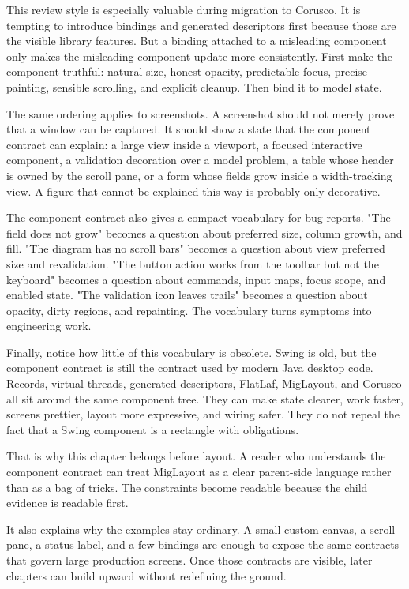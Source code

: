 This review style is especially valuable during migration to Corusco. It is
tempting to introduce bindings and generated descriptors first because those are
the visible library features. But a binding attached to a misleading component
only makes the misleading component update more consistently. First make the
component truthful: natural size, honest opacity, predictable focus, precise
painting, sensible scrolling, and explicit cleanup. Then bind it to model state.

The same ordering applies to screenshots. A screenshot should not merely prove
that a window can be captured. It should show a state that the component
contract can explain: a large view inside a viewport, a focused interactive
component, a validation decoration over a model problem, a table whose header is
owned by the scroll pane, or a form whose fields grow inside a width-tracking
view. A figure that cannot be explained this way is probably only decorative.

The component contract also gives a compact vocabulary for bug reports. "The
field does not grow" becomes a question about preferred size, column growth, and
fill. "The diagram has no scroll bars" becomes a question about view preferred
size and revalidation. "The button action works from the toolbar but not the
keyboard" becomes a question about commands, input maps, focus scope, and
enabled state. "The validation icon leaves trails" becomes a question about
opacity, dirty regions, and repainting. The vocabulary turns symptoms into
engineering work.

Finally, notice how little of this vocabulary is obsolete. Swing is old, but the
component contract is still the contract used by modern Java desktop code.
Records, virtual threads, generated descriptors, FlatLaf, MigLayout, and
Corusco all sit around the same component tree. They can make state clearer,
work faster, screens prettier, layout more expressive, and wiring safer. They
do not repeal the fact that a Swing component is a rectangle with obligations.

That is why this chapter belongs before layout. A reader who understands the
component contract can treat MigLayout as a clear parent-side language rather
than as a bag of tricks. The constraints become readable because the child
evidence is readable first.

It also explains why the examples stay ordinary. A small custom canvas, a
scroll pane, a status label, and a few bindings are enough to expose the same
contracts that govern large production screens. Once those contracts are
visible, later chapters can build upward without redefining the ground.

